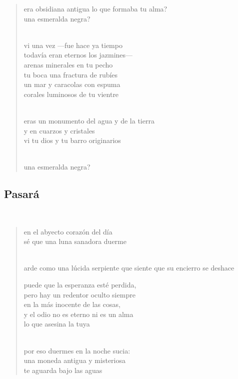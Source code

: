 \documentclass[a4paper, 12pt]{article}
\begin{document}
\begin{verse}
    
era obsidiana antigua lo que formaba tu alma?\\
una esmeralda negra?\\
~ 

vi una vez —fue hace ya tiempo\\
todavía eran eternos los jazmines—\\
arenas minerales en tu pecho\\
tu boca una fractura de rubíes\\
un mar y caracolas con espuma\\
corales luminosos de tu vientre\\
~ 

eras un monumento del agua y de la tierra\\
y en cuarzos y cristales\\
vi tu dios y tu barro originarios\\
~ 

una esmeralda negra?\\
\end{verse}

\pagebreak 
\subsection{Pasará}
~

\begin{verse}
    
en el abyecto corazón del día\\
sé que una luna sanadora duerme\\
~ 

arde como una lúcida serpiente 
que siente que su encierro se deshace
~

puede que la esperanza esté perdida,\\
pero hay un redentor oculto siempre\\
en la más inocente de las cosas,\\
y el odio no es eterno ni es un alma\\
lo que asesina la tuya\\
~

por eso duermes en la noche sucia:\\
una moneda antigua y misteriosa\\
te aguarda bajo las aguas\\
\end{verse}

\pagebreak 
\end{document}

